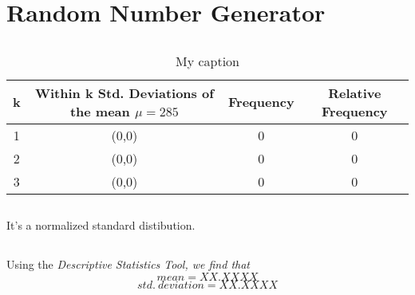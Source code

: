\documentclass[letterpaper]{article}
\begin{document}
\section{Random Number Generator} %

\subsection{} %

\subsection{}

\begin{table}[H]
 \centering
 \begin{tabular}{|c|c|c|c|}
  \hline
  \textbf{k} & \textbf{Within k Std. Deviations of the mean $\mu=285$} & \textbf{Frequency} & \textbf{Relative Frequency} \\ \hline
  1          & (0,0)                                                   & 0                  & 0                           \\ \hline
  2          & (0,0)                                                   & 0                  & 0                           \\ \hline
  3          & (0,0)                                                   & 0                  & 0                           \\ \hline
 \end{tabular}
 \caption{My caption}
 \label{my-label}
\end{table}

\subsection{} %
It's a normalized standard distibution.

\subsection{} %
Using the \textit{Descriptive Statistics Tool, we find that}
$${mean} = XX.XXXX$$
$${std.\ deviation} = XX.XXXX$$
\end{document}
